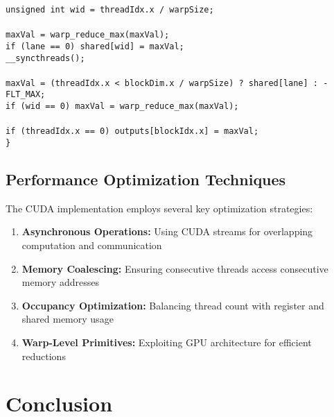 \documentclass[12pt,a4paper]{article}
\begin{document}
\begin{algorithm}[H]
\begin{flushleft}
\hspace{1cm}\texttt{unsigned int wid = threadIdx.x / warpSize;}\\
\\
\hspace{1cm}\texttt{maxVal = warp\_reduce\_max(maxVal);}\\
\hspace{1cm}\texttt{if (lane == 0) shared[wid] = maxVal;}\\
\hspace{1cm}\texttt{\_\_syncthreads();}\\
\\
\hspace{1cm}\texttt{maxVal = (threadIdx.x < blockDim.x / warpSize) ? shared[lane] : -FLT\_MAX;}\\
\hspace{1cm}\texttt{if (wid == 0) maxVal = warp\_reduce\_max(maxVal);}\\
\\
\hspace{1cm}\texttt{if (threadIdx.x == 0) outputs[blockIdx.x] = maxVal;}\\
\texttt{\}}
\end{flushleft}
\end{algorithm}

\subsection{Performance Optimization Techniques}

The CUDA implementation employs several key optimization strategies:

\begin{enumerate}
\item \textbf{Asynchronous Operations:} Using CUDA streams for overlapping computation and communication
\item \textbf{Memory Coalescing:} Ensuring consecutive threads access consecutive memory addresses  
\item \textbf{Occupancy Optimization:} Balancing thread count with register and shared memory usage
\item \textbf{Warp-Level Primitives:} Exploiting GPU architecture for efficient reductions
\end{enumerate}

\section{Conclusion}
\end{document}
